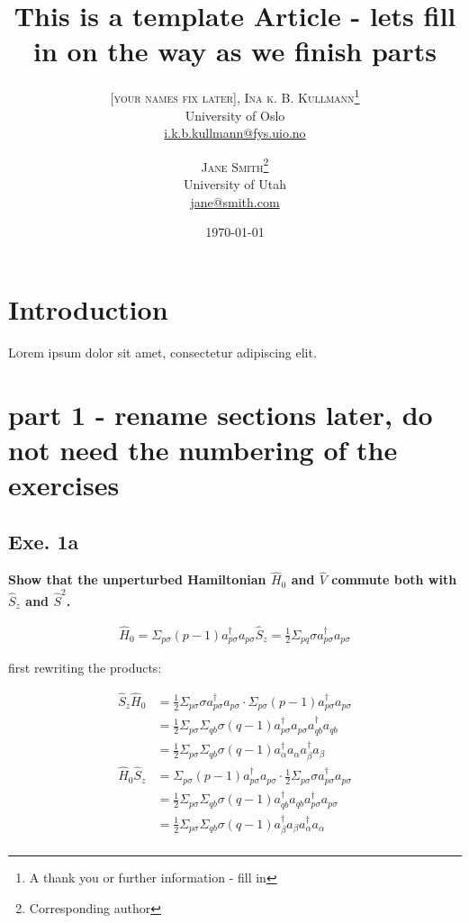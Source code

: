 \documentclass[twoside]{article}
\title{This is a template Article - lets fill in on the way as we finish parts} %
\author{%
\textsc{[your names fix later], Ina k. B. Kullmann}\thanks{A thank you or further information - fill in} \\[1ex] %
\normalsize University of Oslo \\ %
\normalsize \href{mailto:i.k.b.kullmann@fys.uio.no}{i.k.b.kullmann@fys.uio.no} %
\and %
\textsc{Jane Smith}\thanks{Corresponding author} \\[1ex] %
\normalsize University of Utah \\ %
\normalsize \href{mailto:jane@smith.com}{jane@smith.com} %
}
\date{\today} %
\begin{document}
\maketitle


\section{Introduction}

\lettrine[nindent=0em,lines=3]{L} orem ipsum dolor sit amet, consectetur adipiscing elit.
\blindtext %

\blindtext %


\section{part 1 - rename sections later, do not need the numbering of the exercises}

\subsection{ Exe. 1a}

\textbf{Show that the unperturbed Hamiltonian $\hat{H}_0$ and $\hat{V}$ commute both with $\hat{S}_z$ and $\hat{S}^2$. }

\begin{align*}
\hat{H}_0 = \Sigma_{p\sigma} (p-1) a_{p\sigma}^\dagger a_{p\sigma}
\hat{S}_z = \frac{1}{2} \Sigma_{pq} \sigma a_{p\sigma}^\dagger a_{p\sigma}
\end{align*}

first rewriting the products: 

\begin{align*}
\hat{S}_z \hat{H}_0 &= \frac{1}{2} \Sigma_{p\sigma} \sigma a_{p\sigma}^\dagger a_{p\sigma} \cdot  \Sigma_{p\sigma} (p-1) a_{p\sigma}^\dagger a_{p\sigma} \\
&= \frac{1}{2} \Sigma_{p\sigma}  \Sigma_{qb} \sigma (q-1) a_{p\sigma}^\dagger a_{p\sigma}  a_{qb}^\dagger a_{qb} \\
&= \frac{1}{2} \Sigma_{p\sigma}  \Sigma_{qb} \sigma (q-1) a_\alpha^\dagger a_\alpha  a_\beta^\dagger a_\beta \\
\hat{H}_0 \hat{S}_z  &= \Sigma_{p\sigma} (p-1) a_{p\sigma}^\dagger a_{p\sigma} \cdot  \frac{1}{2} \Sigma_{p\sigma} \sigma a_{p\sigma}^\dagger a_{p\sigma} \\
&= \frac{1}{2} \Sigma_{p\sigma}  \Sigma_{qb} \sigma (q-1) a_{qb}^\dagger a_{qb} a_{p\sigma}^\dagger a_{p\sigma} \\
&= \frac{1}{2} \Sigma_{p\sigma}  \Sigma_{qb} \sigma (q-1) a_\beta^\dagger a_\beta a_\alpha^\dagger a_\alpha \\
\end{align*}
\end{document}
